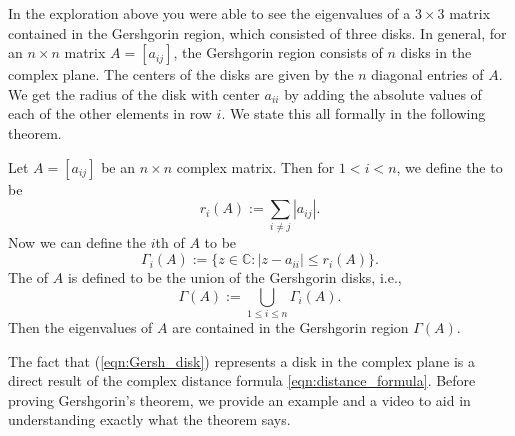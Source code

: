 \documentclass{ximera}
\begin{document}
In the exploration above you were able to see the eigenvalues of a $3 \times 3$ matrix contained in the Gershgorin region, which consisted of three disks.  In general, for an $n \times n$ matrix $A=[a_{ij}]$, the Gershgorin region consists of $n$ disks in the complex plane.  The centers of the disks are given by the $n$ diagonal entries of $A$.  We get the radius of the disk with center $a_{ii}$ by adding the absolute values of each of the other elements in row $i$.  We state this all formally in the following theorem.


\begin{theorem}[Gershgorin]\label{th:Gershgorin}
Let $A=[a_{ij}]$ be an $n\times n$ complex matrix.  Then for $1<i<n$, we define the  to be
$$
r_i(A):= \sum_{i \ne j} |a_{ij}|.
$$
Now we can define the $i$th  of $A$ to be
\begin{equation}\label{eqn:Gersh_disk}
\Gamma_i(A) := \{ z \in \mathbb{C} : |z-a_{ii}| \le r_i(A) \}.
\end{equation}
 The  of $A$ is defined to be the union of the Gershgorin disks, i.e.,
$$
\Gamma(A) := \bigcup_{1 \le i \le n} \Gamma_i(A).
$$
Then the eigenvalues of $A$ are contained in the Gershgorin region $\Gamma(A)$.
\end{theorem}

The fact that (\ref{eqn:Gersh_disk}) represents a disk in the complex plane is a direct result of the complex distance formula \ref{eqn:distance_formula}. Before proving Gershgorin's theorem, we provide an example and a video to aid in understanding exactly what the theorem says.
\end{document}
